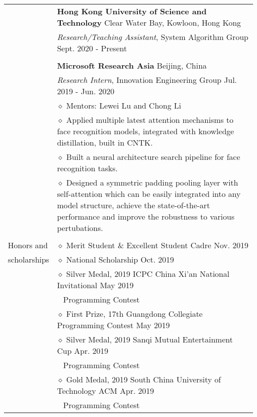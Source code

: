 \documentclass[letterpaper, 11pt]{article}
\begin{document}
\begin{longtable}{p{1.3in}p{4.8in}}
& {\textbf{Hong Kong University of Science and Technology}} \hfill Clear Water Bay, Kowloon, Hong Kong \\
& \textit{Research/Teaching Assistant}, System Algorithm Group \hfill Sept. 2020 - Present \\
& \\
 
& {\textbf{Microsoft Research Asia}} \hfill Beijing, China\\
& \textit{Research Intern}, Innovation Engineering Group \hfill Jul. 2019 - Jun. 2020 \\
& $\diamond$ Mentors: Lewei Lu and Chong Li \\
& $\diamond$ Applied multiple latest attention mechanisms to face recognition models, integrated with knowledge distillation, built in CNTK. \\
& $\diamond$ Built a neural architecture search pipeline for face recognition tasks. \\
& $\diamond$ Designed a symmetric padding pooling layer with self-attention which can be easily integrated into any model structure, achieve the state-of-the-art performance and improve the robustness to various pertubations. \\
& \\

{Honors and }
& $\diamond$ Merit Student \& Excellent Student Cadre \hfill Nov. 2019 \\
{scholarships}
& $\diamond$ National Scholarship \hfill Oct. 2019 \\

& $\diamond$ Silver Medal, 2019 ICPC China Xi'an National Invitational \hfill May 2019 \\
& $\ \ $ Programming Contest \\

& $\diamond$ First Prize, 17th Guangdong Collegiate Programming Contest \hfill May 2019 \\

& $\diamond$ Silver Medal, 2019 Sanqi Mutual Entertainment Cup \hfill Apr. 2019 \\
& $\ \ $ Programming Contest \\

& $\diamond$ Gold Medal, 2019 South China University of Technology ACM \hfill Apr. 2019 \\
& $\ \ $ Programming Contest \\


\end{longtable}
\end{document}
